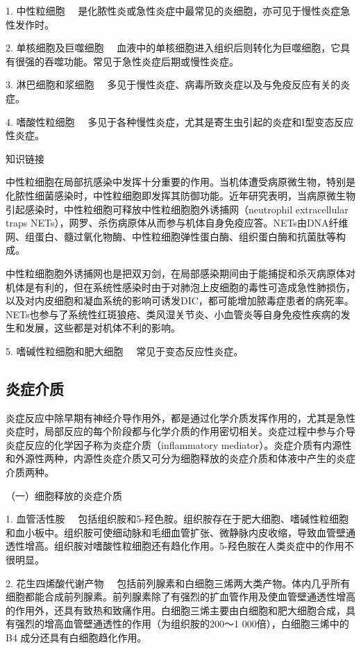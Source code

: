 {1. 中性粒细胞}
　是化脓性炎或急性炎症中最常见的炎细胞，亦可见于慢性炎症急性发作时。

{2. 单核细胞及巨噬细胞}
　血液中的单核细胞进入组织后则转化为巨噬细胞，它具有很强的吞噬功能。常见于急性炎症后期或慢性炎症。

{3. 淋巴细胞和浆细胞}
　多见于慢性炎症、病毒所致炎症以及与免疫反应有关的炎症。

{4. 嗜酸性粒细胞}
　多见于各种慢性炎症，尤其是寄生虫引起的炎症和I型变态反应性炎症。

{知识链接}

中性粒细胞在局部抗感染中发挥十分重要的作用。当机体遭受病原微生物，特别是化脓性细菌感染时，中性粒细胞即发挥其防御功能。近年研究表明，当病原微生物引起感染时，中性粒细胞可释放中性粒细胞胞外诱捕网（neutrophil
extracellular traps
NETs），网罗、杀伤病原体从而参与机体自身免疫应答。NETs由DNA纤维网、组蛋白、髓过氧化物酶、中性粒细胞弹性蛋白酶、组织蛋白酶和抗菌肽等构成。

中性粒细胞胞外诱捕网也是把双刃剑，在局部感染期间由于能捕捉和杀灭病原体对机体是有利的，但在系统性感染时由于对肺泡上皮细胞的毒性可造成急性肺损伤，以及对内皮细胞和凝血系统的影响可诱发DIC，都可能增加脓毒症患者的病死率。NETs也参与了系统性红斑狼疮、类风湿关节炎、小血管炎等自身免疫性疾病的发生和发展，这些都是对机体不利的影响。

{5. 嗜碱性粒细胞和肥大细胞} 　常见于变态反应性炎症。

\subsection{炎症介质}

炎症反应中除早期有神经介导作用外，都是通过化学介质发挥作用的，尤其是急性炎症时，局部反应的每个阶段都与化学介质的作用密切相关。炎症过程中参与介导炎症反应的化学因子称为炎症介质（inflammatory
mediator）。炎症介质有内源性和外源性两种，内源性炎症介质又可分为细胞释放的炎症介质和体液中产生的炎症介质两种。

{（一）细胞释放的炎症介质}

{1. 血管活性胺}
　包括组织胺和5-羟色胺。组织胺存在于肥大细胞、嗜碱性粒细胞和血小板中。组织胺可使细动脉和毛细血管扩张、微静脉内皮收缩，导致血管壁通透性增高。组织胺对嗜酸性粒细胞还有趋化作用。5-羟色胺在人类炎症中的作用不很明显。

{2. 花生四烯酸代谢产物}
　包括前列腺素和白细胞三烯两大类产物。体内几乎所有细胞都能合成前列腺素。前列腺素除了有强烈的扩血管作用及使血管壁通透性增高的作用外，还具有致热和致痛作用。白细胞三烯主要由白细胞和肥大细胞合成，具有强烈的增高血管壁通透性的作用（为组织胺的200～1
000倍），白细胞三烯中的B{4} 成分还具有白细胞趋化作用。

